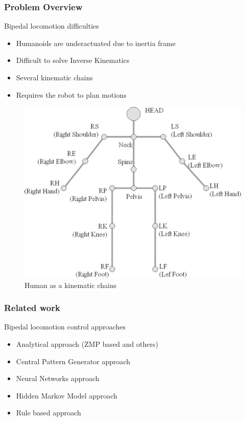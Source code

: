 \documentclass{beamer}
\begin{document}
\begin{frame}
	\frametitle{Problem Overview}
	\begin{block}{Bipedal locomotion difficulties}
		\begin{itemize}
			\item
				Humanoids are underactuated due to inertia frame
			\item
				Difficult to solve Inverse Kinematics
			\item
				Several kinematic chains
			\item 
				Requires the robot to plan motions
		\end{itemize}
	\end{block}
	
	\begin{figure}[h!]
		\begin{minipage}[H]{\linewidth}
			\centering
			\includegraphics[scale=0.5]{presentation_images/7}
			\caption{Human as a kinematic chains \cite{seo2011improved}}
		\end{minipage}
	\end{figure}
\end{frame}


	\begin{frame}
		\frametitle{Related work}
		\begin{block}{Bipedal locomotion control approaches}
			\begin{itemize}
				\item
					Analytical approach (ZMP based and others)
				\item
					Central Pattern Generator approach
				\item
					Neural Networks approach
				\item 
					Hidden Markov Model approach
				\item
					Rule based approach
			\end{itemize}
		\end{block}
	\end{frame}
\end{document}

